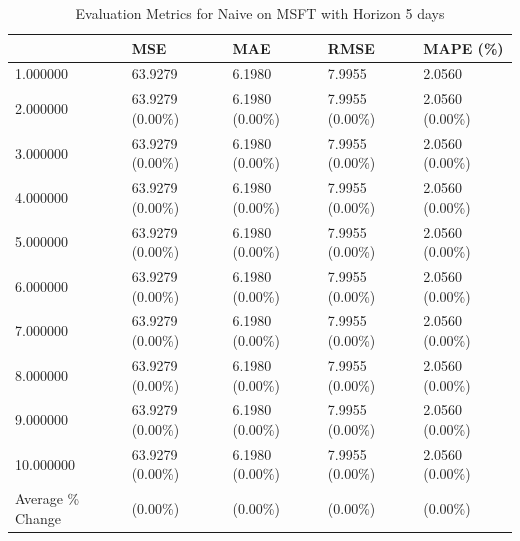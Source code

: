 \begin{table}
\caption{Evaluation Metrics for Naive on MSFT with Horizon 5 days}
\label{tab:naive_MSFT_h5_metrics}
\begin{tabular}{lllll}
\toprule
 & MSE & MAE & RMSE & MAPE (\%) \\
\midrule
1.000000 & 63.9279 & 6.1980 & 7.9955 & 2.0560 \\
2.000000 & 63.9279 (0.00\%) & 6.1980 (0.00\%) & 7.9955 (0.00\%) & 2.0560 (0.00\%) \\
3.000000 & 63.9279 (0.00\%) & 6.1980 (0.00\%) & 7.9955 (0.00\%) & 2.0560 (0.00\%) \\
4.000000 & 63.9279 (0.00\%) & 6.1980 (0.00\%) & 7.9955 (0.00\%) & 2.0560 (0.00\%) \\
5.000000 & 63.9279 (0.00\%) & 6.1980 (0.00\%) & 7.9955 (0.00\%) & 2.0560 (0.00\%) \\
6.000000 & 63.9279 (0.00\%) & 6.1980 (0.00\%) & 7.9955 (0.00\%) & 2.0560 (0.00\%) \\
7.000000 & 63.9279 (0.00\%) & 6.1980 (0.00\%) & 7.9955 (0.00\%) & 2.0560 (0.00\%) \\
8.000000 & 63.9279 (0.00\%) & 6.1980 (0.00\%) & 7.9955 (0.00\%) & 2.0560 (0.00\%) \\
9.000000 & 63.9279 (0.00\%) & 6.1980 (0.00\%) & 7.9955 (0.00\%) & 2.0560 (0.00\%) \\
10.000000 & 63.9279 (0.00\%) & 6.1980 (0.00\%) & 7.9955 (0.00\%) & 2.0560 (0.00\%) \\
Average \% Change & (0.00\%) & (0.00\%) & (0.00\%) & (0.00\%) \\
\bottomrule
\end{tabular}
\end{table}
